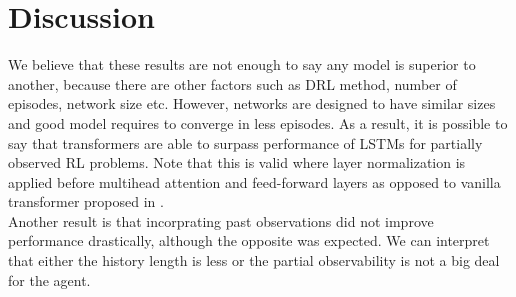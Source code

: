 \section{Discussion}
We believe that these results are not enough to say any model is superior to another, because there are other factors such as DRL method, number of episodes, network size etc. However, networks are designed to have similar sizes and good model requires to converge in less episodes. As a result, it is possible to say that transformers are able to surpass performance of LSTMs for partially observed RL problems. Note that this is valid where layer normalization is applied before multihead attention and feed-forward layers \cite{xiong_layer_2020} as opposed to vanilla transformer proposed in \cite{vaswani_attention_2017}. \\
Another result is that incorprating past observations did not improve performance drastically, although the opposite was expected. We can interpret that either the history length is less or the partial observability is not a big deal for the agent. 